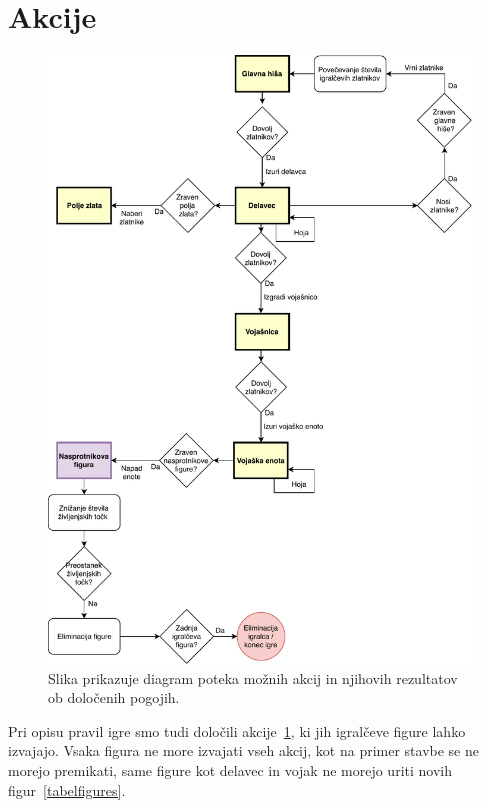 \documentclass[a4paper, 12pt]{book}
\begin{document}
\section{Akcije}

\begin{figure}[h]
	\begin{center}
		\includegraphics[width=1\textwidth]{photos/prikazAkcij.pdf}
	\end{center}
	\caption{Slika prikazuje diagram poteka možnih akcij in njihovih rezultatov ob določenih pogojih.}
	\label{picActions}
\end{figure}

Pri opisu pravil igre smo tudi določili akcije~\ref{picActions}, ki jih igralčeve figure lahko izvajajo. 
Vsaka figura ne more izvajati vseh akcij, kot na primer stavbe se ne morejo premikati, same figure kot delavec in vojak ne morejo uriti novih figur~\ref{tabelfigures}.
\end{document}
